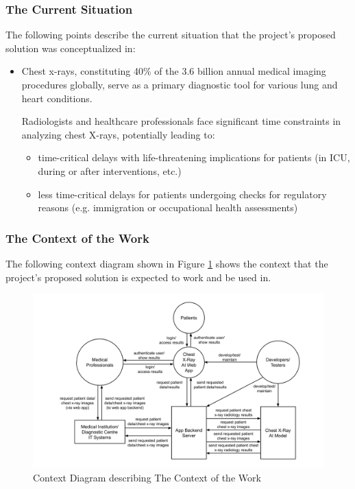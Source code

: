 \documentclass[12pt]{article}
\begin{document}
\subsubsection{The Current Situation}
The following points describe the current situation that the project's proposed solution was conceptualized in:
\begin{itemize}
    \item Chest x-rays, constituting 40\% of the 3.6 billion annual medical imaging procedures globally, serve as a primary diagnostic tool for various lung and heart conditions.
    \begin{item}
        Radiologists and healthcare professionals face significant time constraints in analyzing chest X-rays, potentially leading to:
        \begin{itemize}
            \item time-critical delays with life-threatening implications for patients (in ICU, during or after interventions, etc.)
            \item less time-critical delays for patients undergoing checks for regulatory reasons (e.g. immigration or occupational health assessments)
        \end{itemize}
    \end{item}
\end{itemize}

\subsubsection{The Context of the Work}
The following context diagram shown in Figure \ref{fig:contextDiagram} shows the context that the project's proposed solution is expected to work and be used in.
\begin{figure}[H]
    \centering
    \includegraphics[scale=0.25]{Context Diagram for Chest X-Ray AI Read.png}
    \caption{Context Diagram describing The Context of the Work}
    \label{fig:contextDiagram}
\end{figure}
\end{document}

